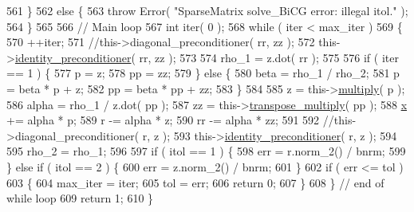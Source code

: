 \begin{DoxyCode}
561     \}
562     \textcolor{keywordflow}{else} \{
563       \textcolor{keywordflow}{throw} Error( \textcolor{stringliteral}{"SparseMatrix solve\_BiCG error: illegal itol."} );
564     \}
565 
566     \textcolor{comment}{// Main loop}
567     \textcolor{keywordtype}{int} iter( 0 );
568     \textcolor{keywordflow}{while} ( iter < max\_iter )
569     \{
570       ++iter;
571       \textcolor{comment}{//this->diagonal\_preconditioner( rr, zz );}
572       this->\hyperlink{classLuna_1_1SparseMatrix_ac196d00210b58f3f62352054f4241411}{identity\_preconditioner}( rr, zz );
573 
574       rho\_1 = z.dot( rr );
575 
576       \textcolor{keywordflow}{if} ( iter == 1 ) \{
577         p = z;
578         pp = zz;
579       \} \textcolor{keywordflow}{else} \{
580         beta = rho\_1 / rho\_2;
581         p = beta * p + z;
582         pp = beta * pp + zz;
583       \}
584 
585       z = this->\hyperlink{classLuna_1_1SparseMatrix_a532c8a8b80b0accf950a642344e7954f}{multiply}( p );
586       alpha = rho\_1 / z.dot( pp );
587       zz = this->\hyperlink{classLuna_1_1SparseMatrix_a64e3d0328b1eaba4f2f75e70b4fe1bb8}{transpose\_multiply}( pp );
588       \hyperlink{namespaceHeat__plot_aa88370c16b85b784ccbde3ed88bc1991}{x} += alpha * p;
589       r -= alpha * z;
590       rr -= alpha * zz;
591 
592       \textcolor{comment}{//this->diagonal\_preconditioner( r, z );}
593       this->\hyperlink{classLuna_1_1SparseMatrix_ac196d00210b58f3f62352054f4241411}{identity\_preconditioner}( r, z );
594 
595       rho\_2 = rho\_1;
596 
597       \textcolor{keywordflow}{if} ( itol == 1 ) \{
598         err = r.norm\_2() / bnrm;
599       \} \textcolor{keywordflow}{else} \textcolor{keywordflow}{if} ( itol == 2 ) \{
600         err = z.norm\_2() / bnrm;
601       \}
602       \textcolor{keywordflow}{if} ( err <= tol )
603       \{
604         max\_iter = iter;
605         tol = err;
606         \textcolor{keywordflow}{return} 0;
607       \}
608     \} \textcolor{comment}{// end of while loop}
609     \textcolor{keywordflow}{return} 1;
610   \}
\end{DoxyCode}
\mbox{\label{classLuna_1_1SparseMatrix_a8fe4fe6d60878d4b23a6895f1a5dc59d}} 
